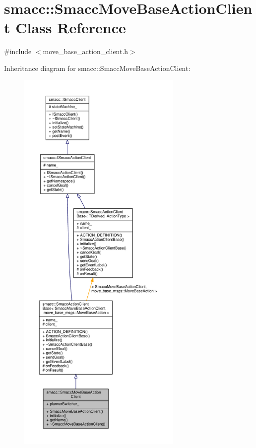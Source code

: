 \hypertarget{classsmacc_1_1SmaccMoveBaseActionClient}{}\section{smacc\+:\+:Smacc\+Move\+Base\+Action\+Client Class Reference}
\label{classsmacc_1_1SmaccMoveBaseActionClient}


{\ttfamily \#include $<$move\+\_\+base\+\_\+action\+\_\+client.\+h$>$}



Inheritance diagram for smacc\+:\+:Smacc\+Move\+Base\+Action\+Client\+:
\nopagebreak
\begin{figure}[H]
\begin{center}
\leavevmode
\includegraphics[height=550pt]{classsmacc_1_1SmaccMoveBaseActionClient__inherit__graph}
\end{center}
\end{figure}


